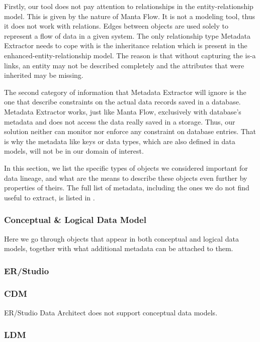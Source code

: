 Firstly, our tool does not pay attention to relationships in the entity-relationship model. 
This is given by the nature of Manta Flow. It is not a modeling tool, thus it does not work with relations. Edges between objects are used solely to represent a flow of data in a given system.
The only relationship type Metadata Extractor needs to cope with is the inheritance relation which is present in the enhanced-entity-relationship model.
The reason is that without capturing the is-a links, an entity may not be described completely and the attributes that were inherited may be missing.

The second category of information that Metadata Extractor will ignore is the one that describe constraints on the actual data records saved in a database. 
Metadata Extractor works, just like Manta Flow, exclusively with database's metadata and does not access the data really saved in a storage. 
Thus, our solution neither can monitor nor enforce any constraint on database entries. 
That is why the metadata like keys or data types, which are also defined in data models, will not be in our domain of interest.

In this section, we list the specific types of objects we considered important for data lineage, and what are the means to describe these objects even further by properties of theirs. 
The full list of metadata, including the ones we do not find useful to extract, is listed in .

\subsubsection{Conceptual \& Logical Data Model}

Here we go through objects that appear in both conceptual and logical data models, together with what additional metadata can be attached to them.

\subsubsection{ER/Studio}

\subsubsection{CDM}

ER/Studio Data Architect does not support conceptual data models.

\subsubsection{LDM}

